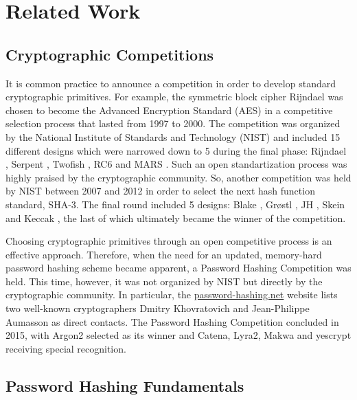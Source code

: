 \chapter{Related Work}
\label{chapter:related-work}

\section{Cryptographic Competitions}
\label{sec:cyptocomps}

It is common practice to announce a competition in order to develop standard cryptographic primitives. For example, the symmetric block cipher Rijndael \cite{daemen:2002:DRA} was chosen to become the Advanced Encryption Standard (AES) \cite{aes-fips} in a competitive selection process that lasted from 1997 to 2000. The competition was organized by the National Institute of Standards and Technology (NIST) and included 15 different designs which were narrowed down to 5 during the final phase: Rijndael \cite{daemen:2002:DRA}, Serpent \cite{anderson:1988:serpent}, Twofish \cite{schneier:1998:twofish}, RC6 \cite{rivest:1998:rc6} and MARS \cite{burwick:1998:mars}. Such an open standartization process was highly praised by the cryptographic community. So, another competition was held by NIST between 2007 and 2012 in order to select the next hash function standard, SHA-3. The final round included 5 designs: Blake \cite{aumasson:2013:blake2}, Grøstl \cite{praveen:2011:groestl}, JH \cite{wu:2011:jh}, Skein \cite{ferguson:2009:skein} and Keccak \cite{cryptoeprint:2015:keccak}, the last of which ultimately became the winner of the competition.

Choosing cryptographic primitives through an open competitive process is an effective approach. Therefore, when the need for an updated, memory-hard password hashing scheme became apparent, a Password Hashing Competition was held. This time, however, it was not organized by NIST but directly by the cryptographic community. In particular, the \url{password-hashing.net} website lists two well-known cryptographers Dmitry Khovratovich and Jean-Philippe Aumasson as direct contacts. The Password Hashing Competition concluded in 2015, with Argon2 selected as its winner and Catena, Lyra2, Makwa and yescrypt receiving special recognition.

\section{Password Hashing Fundamentals}
\label{sec:fundamentals}

